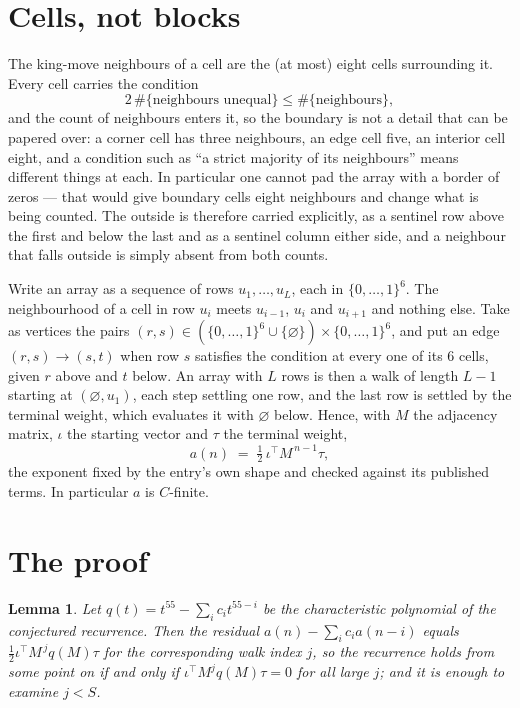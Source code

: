 \documentclass[11pt,a4paper]{article}
\theoremstyle{plain}
\newtheorem{lemma}[theorem]{Lemma}
\theoremstyle{definition}
\begin{document}
\section{Cells, not blocks}

The king-move neighbours of a cell are the (at most) eight cells surrounding it. Every cell
carries the condition
\[
2\,\#\{\text{neighbours unequal}\}\le\#\{\text{neighbours}\},
\]
and the count of neighbours enters it, so the boundary is not a detail that can be papered
over: a corner cell has three neighbours, an edge cell five, an interior cell eight, and a
condition such as ``a strict majority of its neighbours'' means different things at each. In
particular one cannot pad the array with a border of zeros --- that would give boundary cells
eight neighbours and change what is being counted. The outside is therefore carried
explicitly, as a sentinel row above the first and below the last and as a sentinel column
either side, and a neighbour that falls outside is simply absent from both counts.

Write an array as a sequence of rows $u_1,\dots,u_L$, each in
$\{0,\dots,1\}^{6}$. The neighbourhood of a cell in row $u_i$ meets $u_{i-1}$,
$u_i$ and $u_{i+1}$ and nothing else. Take as vertices the pairs
$(r,s)\in(\{0,\dots,1\}^{6}\cup\{\varnothing\})\times\{0,\dots,1\}^{6}$,
and put an edge $(r,s)\to(s,t)$ when row $s$ satisfies the condition at every one of its
$6$ cells, given $r$ above and $t$ below. An array with $L$ rows is then a walk of length
$L-1$ starting at $(\varnothing,u_1)$, each step settling one row, and the last row is
settled by the terminal weight, which evaluates it with $\varnothing$ below. Hence,
with $M$ the adjacency matrix, $\iota$ the starting vector and $\tau$ the terminal weight,
\[
a(n)\;=\;\tfrac1{2}\,\iota^{\!\top}M^{\,n-1}\tau ,
\]
the exponent fixed by the entry's own shape and checked against its published terms. In
particular $a$ is $C$-finite.

\section{The proof}

\begin{lemma}\label{lem:crit}
Let $q(t)=t^{55}-\sum_i c_it^{55-i}$ be the characteristic polynomial of the
conjectured recurrence. Then the residual $a(n)-\sum_ic_ia(n-i)$ equals
$\tfrac1{2}\iota^{\!\top}M^{\,j}q(M)\tau$ for the corresponding walk index $j$, so the
recurrence holds from some point on if and only if $\iota^{\!\top}M^{j}q(M)\tau=0$ for all
large $j$; and it is enough to examine $j<S$.
\end{lemma}
\end{document}

